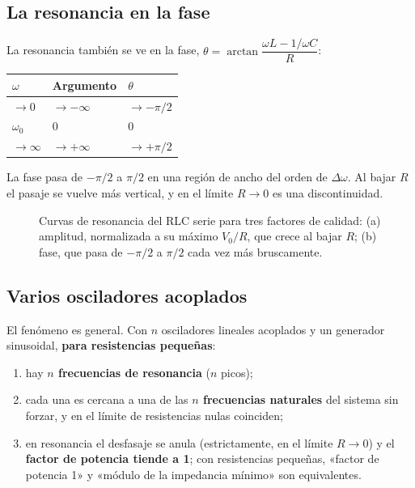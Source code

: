 \documentclass[12pt,a4paper]{article}
\begin{document}
\subsection{La resonancia en la fase}

La resonancia también se ve en la fase, $\theta = \arctan\dfrac{\omega L - 1/\omega C}{R}$:

\begin{center}
\renewcommand{\arraystretch}{1.35}
\small
\begin{tabularx}{\textwidth}{l>{\raggedright\arraybackslash}X>{\raggedright\arraybackslash}X}
\toprule
\textbf{$\omega$} & \textbf{Argumento} & \textbf{$\theta$} \\
\midrule
$\to0$ & $\to-\infty$ & $\to-\pi/2$ \\
$\omega_0$ & $0$ & $0$ \\
$\to\infty$ & $\to+\infty$ & $\to+\pi/2$ \\
\bottomrule
\end{tabularx}
\end{center}

La fase pasa de $-\pi/2$ a $\pi/2$ en una región de ancho del orden de
$\Delta\omega$. Al bajar $R$ el pasaje se vuelve más vertical, y en el límite
$R\to0$ es una discontinuidad.

\begin{figure}[H]
  \centering
  
  \caption{Curvas de resonancia del RLC serie para tres factores de calidad: (a) amplitud, normalizada a su máximo $V_0/R$, que crece al bajar $R$; (b) fase, que pasa de $-\pi/2$ a $\pi/2$ cada vez más bruscamente.}
\end{figure}

\subsection{Varios osciladores acoplados}

El fenómeno es general. Con $n$ osciladores lineales acoplados y un generador
sinusoidal, \textbf{para resistencias pequeñas}:

\begin{enumerate}
  \item hay \textbf{$n$ frecuencias de resonancia} ($n$ picos);
  \item cada una es cercana a una de las \textbf{$n$ frecuencias naturales} del sistema
  sin forzar, y en el límite de resistencias nulas coinciden;
  \item en resonancia el desfasaje se anula (estrictamente, en el límite $R\to0$) y
  el \textbf{factor de potencia tiende a 1}; con resistencias pequeñas, «factor de
  potencia 1» y «módulo de la impedancia mínimo» son equivalentes.
\end{enumerate}
\end{document}
